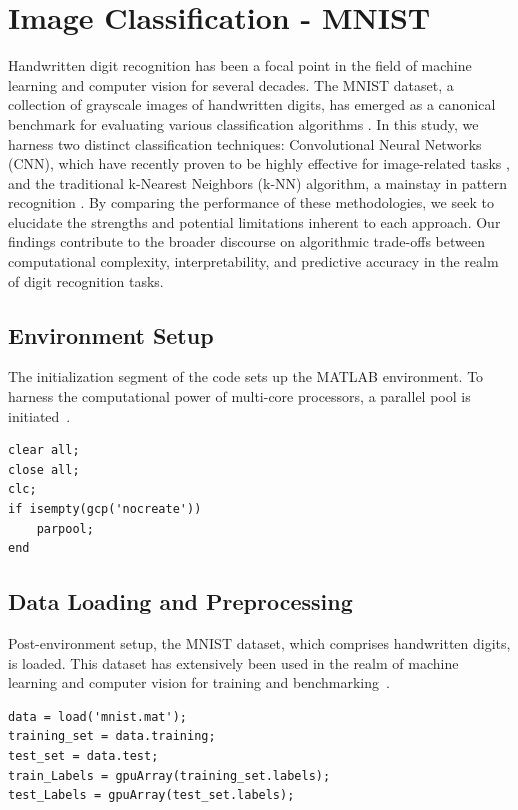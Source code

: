 \section{Image Classification - MNIST}
\label{sec:Image Classification - MNIST}
Handwritten digit recognition has been a focal point in the field of machine learning and computer vision for several decades. The MNIST dataset, a collection of grayscale images of handwritten digits, has emerged as a canonical benchmark for evaluating various classification algorithms \cite{lecun1998mnist}. In this study, we harness two distinct classification techniques: Convolutional Neural Networks (CNN), which have recently proven to be highly effective for image-related tasks \cite{goodfellow2016deep}, and the traditional k-Nearest Neighbors (k-NN) algorithm, a mainstay in pattern recognition \cite{james2013introduction}. By comparing the performance of these methodologies, we seek to elucidate the strengths and potential limitations inherent to each approach. Our findings contribute to the broader discourse on algorithmic trade-offs between computational complexity, interpretability, and predictive accuracy in the realm of digit recognition tasks.
\subsection{Environment Setup}

The initialization segment of the code sets up the MATLAB environment. To harness the computational power of multi-core processors, a parallel pool is initiated~\cite{matlabparallel}.
\begin{lstlisting}[style=Matlab-editor]
clear all;
close all;
clc;
if isempty(gcp('nocreate'))
    parpool;
end
\end{lstlisting}

\subsection{Data Loading and Preprocessing}

Post-environment setup, the MNIST dataset, which comprises handwritten digits, is loaded. This dataset has extensively been used in the realm of machine learning and computer vision for training and benchmarking~\cite{lecun1998mnist}.
\begin{lstlisting}[style=Matlab-editor]
data = load('mnist.mat');
training_set = data.training;
test_set = data.test;
train_Labels = gpuArray(training_set.labels);
test_Labels = gpuArray(test_set.labels); 
\end{lstlisting}

